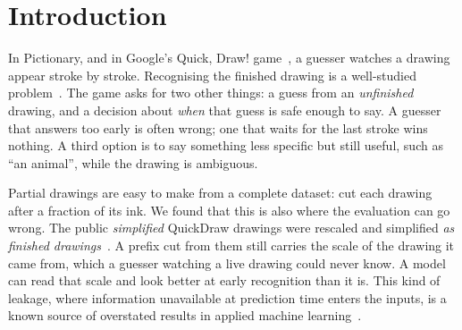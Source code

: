 \section{Introduction}
\label{sec:intro}

In Pictionary, and in Google's Quick, Draw! game~\cite{quickdraw_dataset}, a guesser watches a
drawing appear stroke by stroke. Recognising the finished drawing is a well-studied
problem~\cite{eitz2012humans,yu2017sketchanet,xu2023survey}. The game asks for two other things:
a guess from an \emph{unfinished} drawing, and a decision about \emph{when} that guess is safe
enough to say. A guesser that answers too early is often wrong; one that waits for the last
stroke wins nothing. A third option is to say something less specific but still useful, such as
``an animal'', while the drawing is ambiguous.

Partial drawings are easy to make from a complete dataset: cut each drawing after a fraction of
its ink. We found that this is also where the evaluation can go wrong. The public
\emph{simplified} QuickDraw drawings were rescaled and simplified \emph{as finished
drawings}~\cite{quickdraw_dataset}. A prefix cut from them still carries the scale of the drawing
it came from, which a guesser watching a live drawing could never know. A model can read that
scale and look better at early recognition than it is. This kind of leakage, where information
unavailable at prediction time enters the inputs, is a known source of overstated results in
applied machine learning~\cite{kapoor2023leakage}.

